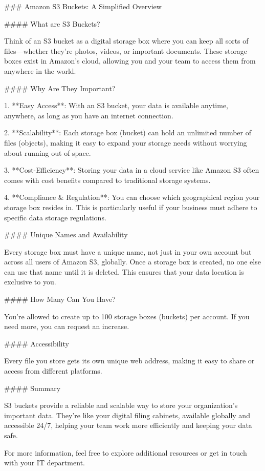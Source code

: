 ### Amazon S3 Buckets: A Simplified Overview

#### What are S3 Buckets?

Think of an S3 bucket as a digital storage box where you can keep all sorts of files—whether they're photos, videos, or important documents. These storage boxes exist in Amazon's cloud, allowing you and your team to access them from anywhere in the world.

#### Why Are They Important?

1. **Easy Access**: With an S3 bucket, your data is available anytime, anywhere, as long as you have an internet connection.
  
2. **Scalability**: Each storage box (bucket) can hold an unlimited number of files (objects), making it easy to expand your storage needs without worrying about running out of space.

3. **Cost-Efficiency**: Storing your data in a cloud service like Amazon S3 often comes with cost benefits compared to traditional storage systems.

4. **Compliance & Regulation**: You can choose which geographical region your storage box resides in. This is particularly useful if your business must adhere to specific data storage regulations.

#### Unique Names and Availability

Every storage box must have a unique name, not just in your own account but across all users of Amazon S3, globally. Once a storage box is created, no one else can use that name until it is deleted. This ensures that your data location is exclusive to you.

#### How Many Can You Have?

You're allowed to create up to 100 storage boxes (buckets) per account. If you need more, you can request an increase.

#### Accessibility

Every file you store gets its own unique web address, making it easy to share or access from different platforms. 

#### Summary

S3 buckets provide a reliable and scalable way to store your organization's important data. They're like your digital filing cabinets, available globally and accessible 24/7, helping your team work more efficiently and keeping your data safe.

For more information, feel free to explore additional resources or get in touch with your IT department.